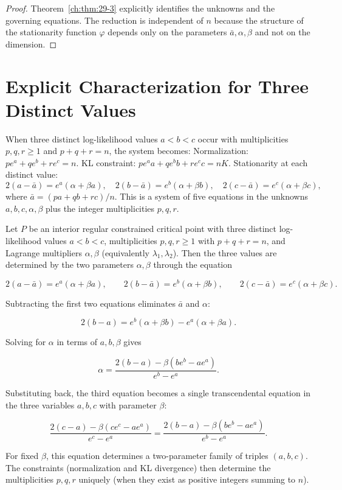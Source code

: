 \begin{proof}
Theorem~\ref{ch:thm:29-3} explicitly identifies the unknowns and the governing equations. The reduction is independent of \(n\) because the structure of the stationarity function \(\varphi\) depends only on the parameters \(\bar a,\alpha,\beta\) and not on the dimension. 
\end{proof}
\section{Explicit Characterization for Three Distinct Values}
When three distinct log-likelihood values \(a<b<c\) occur with multiplicities \(p,q,r\ge1\) and \(p+q+r=n\), the system becomes:
Normalization: \(p e^{a}+q e^{b}+r e^{c}=n\).
KL constraint: \(p e^{a}a+q e^{b}b+r e^{c}c=nK\).
Stationarity at each distinct value:
\[
2(a-\bar a)=e^{a}(\alpha+\beta a),\quad
2(b-\bar a)=e^{b}(\alpha+\beta b),\quad
2(c-\bar a)=e^{c}(\alpha+\beta c),
\]
where \(\bar a=(p a+q b+r c)/n\).
This is a system of five equations in the unknowns \(a,b,c,\alpha,\beta\) plus the integer multiplicities \(p,q,r\).

\begin{theorem}
\label{ch:thm:three-level-param}
Let \(P\) be an interior regular constrained critical point with three distinct log-likelihood values \(a<b<c\), multiplicities \(p,q,r\ge1\) with \(p+q+r=n\), and Lagrange multipliers \(\alpha,\beta\) (equivalently \(\lambda_1,\lambda_2\)).  Then the three values are determined by the two parameters \(\alpha,\beta\) through the equation

\[
2(a-\bar a) = e^{a}(\alpha+\beta a),\qquad
2(b-\bar a) = e^{b}(\alpha+\beta b),\qquad
2(c-\bar a) = e^{c}(\alpha+\beta c).
\]

Subtracting the first two equations eliminates \(\bar a\) and \(\alpha\):

\[
2(b-a) = e^{b}(\alpha+\beta b) - e^{a}(\alpha+\beta a).
\]

Solving for \(\alpha\) in terms of \(a,b,\beta\) gives

\[
\alpha = \frac{2(b-a) - \beta(b e^{b} - a e^{a})}{e^{b} - e^{a}}.
\]

Substituting back, the third equation becomes a single transcendental
equation in the three variables \(a,b,c\) with parameter \(\beta\):

\[
\frac{2(c-a) - \beta(c e^{c} - a e^{a})}{e^{c} - e^{a}}
=
\frac{2(b-a) - \beta(b e^{b} - a e^{a})}{e^{b} - e^{a}}.
\]

For fixed \(\beta\), this equation determines a two-parameter family of
triples \((a,b,c)\).  The constraints (normalization and KL divergence)
then determine the multiplicities \(p,q,r\) uniquely (when they exist as
positive integers summing to \(n\)).
\end{theorem}

